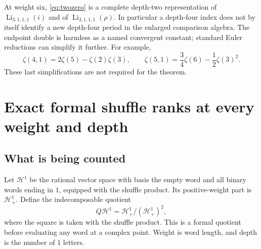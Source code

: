 \documentclass[11pt]{article}
\numberwithin{equation}{section}
\theoremstyle{definition}\newtheorem{definition}[theorem]{Definition}
\theoremstyle{remark}\newtheorem{remark}[theorem]{Remark}
\DeclareMathOperator{\Li}{Li}
\begin{document}
At weight six, \eqref{eq:twozero} is a complete depth-two representation
of $\Li_{3,1,1,1}(i)$ and of $\Li_{3,1,1,1}(\rho)$.
In particular a depth-four index does not by itself identify a new
depth-four period in the enlarged comparison algebra.
The endpoint double is harmless as a named convergent constant;
standard Euler reductions can simplify it further. For example,
\[
 \zeta(4,1)=2\zeta(5)-\zeta(2)\zeta(3),\qquad
 \zeta(5,1)=\frac34\zeta(6)-\frac12\zeta(3)^2.
\]
These last simplifications are not required for the theorem.

\section{Exact formal shuffle ranks at every weight and depth}

\subsection{What is being counted}
Let $\mathcal H^1$ be the rational vector space with basis the empty
word and all binary words ending in $1$, equipped with the shuffle
product. Its positive-weight part is $\mathcal H^1_+$.
Define the indecomposable quotient
\[
 Q\mathcal H^1=\mathcal H^1_+/(\mathcal H^1_+)^2,
\]
where the square is taken with the shuffle product.
This is a formal quotient before evaluating any word at a complex point.
Weight is word length, and depth is the number of $1$ letters.
\end{document}
